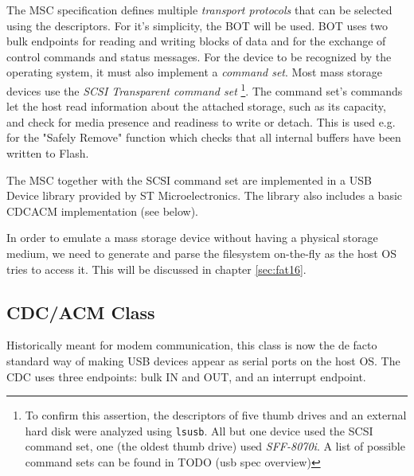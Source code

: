 The \gls{MSC} specification defines multiple \textit{transport protocols} that can be selected using the descriptors. For it's simplicity, the \gls{BOT} will be used. \gls{BOT} uses two bulk endpoints for reading and writing blocks of data and for the exchange of control commands and status messages. For the device to be recognized by the operating system, it must also implement a \textit{command set}. Most mass storage devices use the \textit{\gls{SCSI} Transparent command set}
\footnote{To confirm this assertion, the descriptors of five thumb drives and an external hard disk were analyzed using \verb|lsusb|. All but one device used the SCSI command set, one (the oldest thumb drive) used \textit{SFF-8070i}. A list of possible command sets can be found in TODO (usb spec overview)}.
The command set's commands let the host read information about the attached storage, such as its capacity, and check for media presence and readiness to write or detach. This is used e.g. for the "Safely Remove" function which checks that all internal buffers have been written to Flash.






The \gls{MSC} together with the \gls{SCSI} command set are implemented in a \gls{USB} Device library provided by ST Microelectronics. The library also includes a basic \gls{CDCACM} implementation (see below).

In order to emulate a mass storage device without having a physical storage medium, we need to generate and parse the filesystem on-the-fly as the host \gls{OS} tries to access it. This will be discussed in chapter \ref{sec:fat16}.

\subsection{CDC/ACM Class} \label{sec:cdc-acm}


Historically meant for modem communication, this class is now the de facto standard way of making \gls{USB} devices appear as serial ports on the host \gls{OS}. The \gls{CDC} uses three endpoints: bulk IN and OUT, and an interrupt endpoint.

